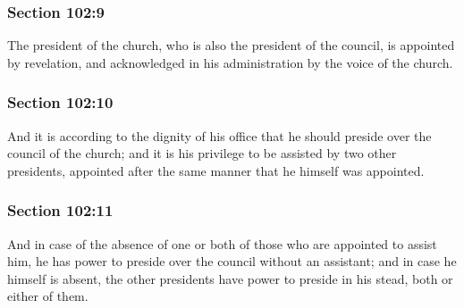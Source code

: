 	\subsubsection{Section 102:9} %
		\label{DC102-9}

		The president of the church, who is also the president of the council, is appointed by revelation, and acknowledged in his administration by the voice of the church.


	\subsubsection{Section 102:10} %
		\label{DC102-10}

		And it is according to the dignity of his office that he should preside over the council of the church; and it is his privilege to be assisted by two other presidents, appointed after the same manner that he himself was appointed.


	\subsubsection{Section 102:11} %
		\label{DC102-11}

		And in case of the absence of one or both of those who are appointed to assist him, he has power to preside over the council without an assistant; and in case he himself is absent, the other presidents have power to preside in his stead, both or either of them.


